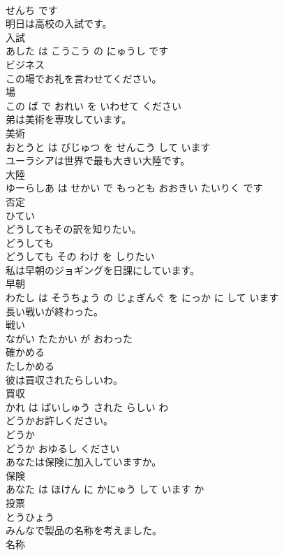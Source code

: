 \documentclass[8pt]{extreport}
\begin{document}
\begin{CJK}{UTF8}{min}
\\	せんち です			
\\	明日は高校の入試です。	
\\	入試 
\\	あした は こうこう の にゅうし です			
\\	ビジネス	
\\	この場でお礼を言わせてください。	
\\	場 
\\	この ば で おれい を いわせて ください			
\\	弟は美術を専攻しています。	
\\	美術 
\\	おとうと は びじゅつ を せんこう して います			
\\	ユーラシアは世界で最も大きい大陸です。	
\\	大陸 
\\	ゆーらしあ は せかい で もっとも おおきい たいりく です			
\\	否定	
\\	ひてい			
\\	どうしてもその訳を知りたい。	
\\	どうしても 
\\	どうしても その わけ を しりたい			
\\	私は早朝のジョギングを日課にしています。	
\\	早朝 
\\	わたし は そうちょう の じょぎんぐ を にっか に して います			
\\	長い戦いが終わった。	
\\	戦い 
\\	ながい たたかい が おわった			
\\	確かめる	
\\	たしかめる			
\\	彼は買収されたらしいわ。	
\\	買収 
\\	かれ は ばいしゅう された らしい わ			
\\	どうかお許しください。	
\\	どうか 
\\	どうか おゆるし ください			
\\	あなたは保険に加入していますか。	
\\	保険 
\\	あなた は ほけん に かにゅう して います か			
\\	投票	
\\	とうひょう			
\\	みんなで製品の名称を考えました。	
\\	名称 

\end{CJK}
\end{document}
